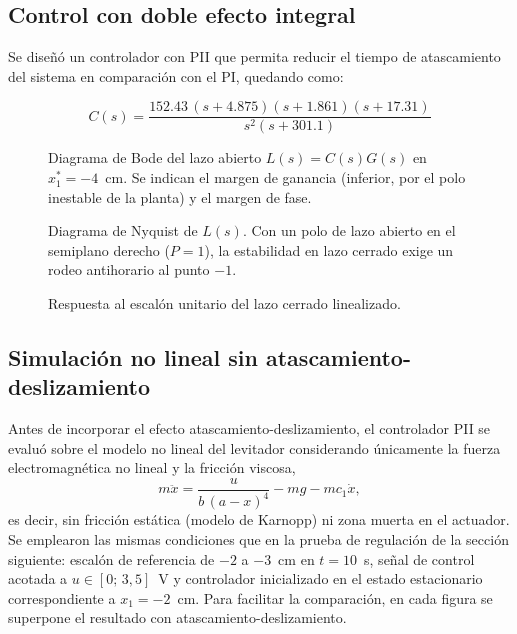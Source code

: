 

\subsection{Control con doble efecto integral}
Se diseñó un controlador con PII que permita reducir el tiempo de atascamiento del sistema en comparación con el PI, quedando como:

\[
C(s)=\frac{152.43\,(s+4.875)(s+1.861)(s+17.31)}
{s^{2}(s+301.1)}
\]

\begin{figure}[ht]
    \centering
    
    \caption[Diagrama de Bode]{Diagrama de Bode del lazo abierto $L(s)=C(s)G(s)$ en $x_1^*=-4$~cm. Se indican el margen de ganancia (inferior, por el polo inestable de la planta) y el margen de fase.}
    \label{bode_fase}
\end{figure}

\begin{figure}[ht]
    \centering
    
    \caption[Diagrama de Nyquist]{Diagrama de Nyquist de $L(s)$. Con un polo de lazo abierto en el semiplano derecho ($P=1$), la estabilidad en lazo cerrado exige un rodeo antihorario al punto $-1$.}
    \label{nyquist}
\end{figure}

\begin{figure}[ht]
    \centering
    
    \caption[Respuesta al escalón]{Respuesta al escalón unitario del lazo cerrado linealizado.}
    \label{step_response}
\end{figure}    

\FloatBarrier
\newpage



\subsection{Simulación no lineal sin atascamiento-deslizamiento}

Antes de incorporar el efecto atascamiento-deslizamiento, el controlador PII se evaluó sobre el modelo no lineal del levitador considerando únicamente la fuerza electromagnética no lineal y la fricción viscosa,
\[
m\ddot{x} = \frac{u}{b\,(a-x)^4} - m g - m c_1 \dot{x},
\]
es decir, sin fricción estática (modelo de Karnopp) ni zona muerta en el actuador. Se emplearon las mismas condiciones que en la prueba de regulación de la sección siguiente: escalón de referencia de $-2$ a $-3$~cm en $t=10$~s, señal de control acotada a $u\in[0;\,3{,}5]$~V y controlador inicializado en el estado estacionario correspondiente a $x_1=-2$~cm. Para facilitar la comparación, en cada figura se superpone el resultado con atascamiento-deslizamiento.

